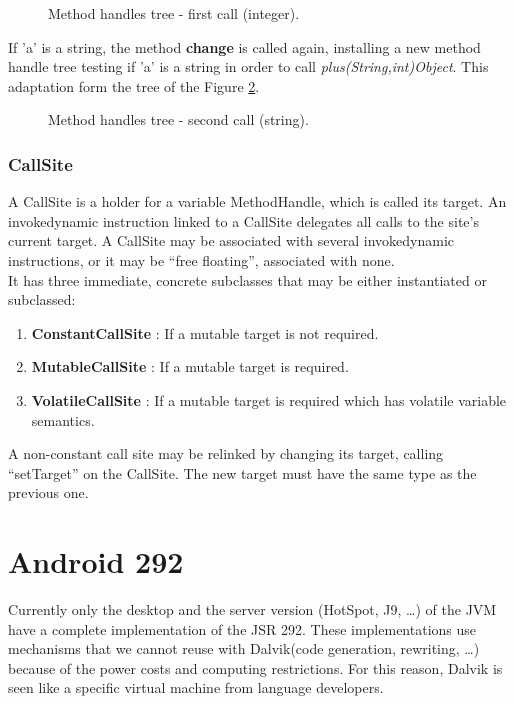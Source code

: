 \documentclass{sig-alternate}
\def \DALVIK{Dalvik\xspace}
\begin{document}
      \begin{figure}[!h]
        \hspace{-.6in} \resizebox{1.3\linewidth}{!}{}
        \caption{Method handles tree - first call (integer).}
        \label{ast2}
      \end{figure}

      If 'a' is a string, the method {\bf change} is called again,
      installing a new method handle tree testing if 'a' is a string in order to call {\it plus(String,int)Object}.
      This adaptation form the tree of the Figure \ref{ast3}.

      \begin{figure}
        \centering \resizebox{.9\linewidth}{!}{}
        \caption{Method handles tree - second call (string).}
        \label{ast3}
      \end{figure}

    \subsubsection{CallSite}

      A CallSite is a holder for a variable MethodHandle, which is called its target.
      An invokedynamic instruction linked to a CallSite delegates all calls to the site's current target.
      A CallSite may be associated with several invokedynamic instructions,
      or it may be ``free floating'', associated with none.\\

      It has three immediate, concrete subclasses that may be either instantiated or subclassed:
      \begin{enumerate}
        \item \textbf{ConstantCallSite} : If a mutable target is not required.
        \item \textbf{MutableCallSite}  : If a mutable target is required.
        \item \textbf{VolatileCallSite} : If a mutable target is required which has volatile variable semantics.
      \end{enumerate}
      A non-constant call site may be relinked by changing its target, calling ``setTarget'' on the CallSite.
      The new target must have the same type as the previous one.

\section{Android 292}
  Currently only the desktop and the server version (HotSpot, J9, \dots) of the JVM have a complete implementation of the JSR 292.
  These implementations use mechanisms that we cannot reuse with \DALVIK (code generation, rewriting, \dots)
  because of the power costs and computing restrictions.
  For this reason, \DALVIK is seen like a specific virtual machine from language developers.
    
\end{document}
